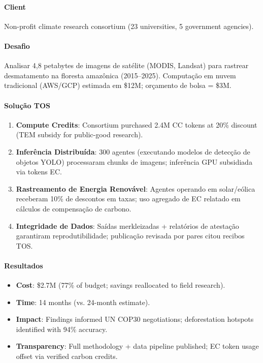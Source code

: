 \documentclass[11pt]{article}
\begin{document}
\begin{itemize}[noitemsep]
\begin{itemize}[noitemsep]
\begin{itemize}[noitemsep]
\paragraph{Client} Non-profit climate research consortium (23 universities, 5 government agencies).

\paragraph{Desafio} Analisar 4,8 petabytes de imagens de satélite (MODIS, Landsat) para rastrear desmatamento na floresta amazônica (2015--2025). Computação em nuvem tradicional (AWS/GCP) estimada em \$12M; orçamento de bolsa = \$3M.

\paragraph{Solução TOS}
\begin{enumerate}[noitemsep]
  \item \textbf{Compute Credits}: Consortium purchased 2.4M CC tokens at 20\% discount (TEM subsidy for public-good research).
  \item \textbf{Inferência Distribuída}: 300 agentes (executando modelos de detecção de objetos YOLO) processaram chunks de imagens; inferência GPU subsidiada via tokens EC.
  \item \textbf{Rastreamento de Energia Renovável}: Agentes operando em solar/eólica receberam 10\% de descontos em taxas; uso agregado de EC relatado em cálculos de compensação de carbono.
  \item \textbf{Integridade de Dados}: Saídas merkleizadas + relatórios de atestação garantiram reprodutibilidade; publicação revisada por pares citou recibos TOS.
\end{enumerate}

\paragraph{Resultados}
\begin{itemize}[noitemsep]
  \item \textbf{Cost}: \$2.7M (77\% of budget; savings reallocated to field research).
  \item \textbf{Time}: 14 months (vs. 24-month estimate).
  \item \textbf{Impact}: Findings informed UN COP30 negotiations; deforestation hotspots identified with 94\% accuracy.
  \item \textbf{Transparency}: Full methodology + data pipeline published; EC token usage offset via verified carbon credits.
\end{itemize}


\end{itemize}
\end{itemize}
\end{itemize}
\end{document}
